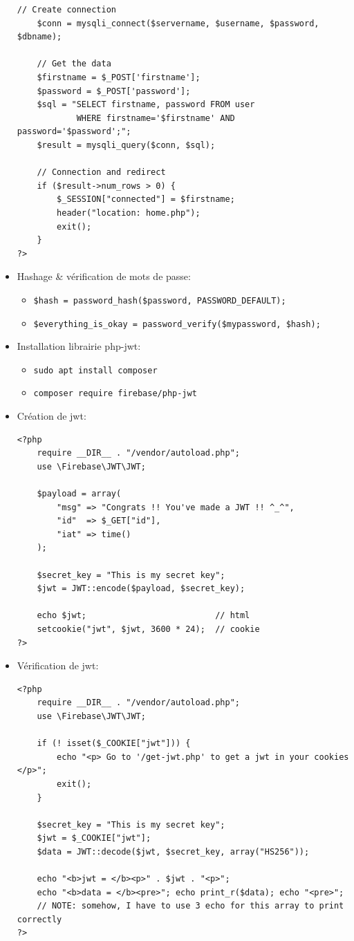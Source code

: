 \documentclass[a4paper]{article}
\begin{document}
\begin{itemize}
\begin{lstlisting}[style=php]
    // Create connection
    $conn = mysqli_connect($servername, $username, $password, $dbname);

    // Get the data
    $firstname = $_POST['firstname'];
    $password = $_POST['password'];
    $sql = "SELECT firstname, password FROM user
            WHERE firstname='$firstname' AND password='$password';";
    $result = mysqli_query($conn, $sql);

    // Connection and redirect
    if ($result->num_rows > 0) {
        $_SESSION["connected"] = $firstname;
        header("location: home.php");
        exit();
    }
?>
\end{lstlisting}


\item Hashage \& vérification de mots de passe:
\begin{itemize}
    \item \texttt{\$hash = password\_hash(\$password, PASSWORD\_DEFAULT);}
    \item \texttt{\$everything\_is\_okay = password\_verify(\$mypassword, \$hash);}
\end{itemize}


\item Installation librairie php-jwt:
\begin{itemize}
    \item \texttt{sudo apt install composer}
    \item \texttt{composer require firebase/php-jwt}
\end{itemize}


\item Création de jwt:
\begin{lstlisting}[style=php]
<?php
    require __DIR__ . "/vendor/autoload.php";
    use \Firebase\JWT\JWT;

    $payload = array(
        "msg" => "Congrats !! You've made a JWT !! ^_^",
        "id"  => $_GET["id"],
        "iat" => time()
    );

    $secret_key = "This is my secret key";
    $jwt = JWT::encode($payload, $secret_key);

    echo $jwt;                          // html
    setcookie("jwt", $jwt, 3600 * 24);  // cookie
?>
\end{lstlisting}


\item Vérification de jwt:
\begin{lstlisting}[style=php]
<?php
    require __DIR__ . "/vendor/autoload.php";
    use \Firebase\JWT\JWT;

    if (! isset($_COOKIE["jwt"])) {
        echo "<p> Go to '/get-jwt.php' to get a jwt in your cookies </p>";
        exit();
    }

    $secret_key = "This is my secret key";
    $jwt = $_COOKIE["jwt"];
    $data = JWT::decode($jwt, $secret_key, array("HS256"));

    echo "<b>jwt = </b><p>" . $jwt . "<p>";
    echo "<b>data = </b><pre>"; echo print_r($data); echo "<pre>";
    // NOTE: somehow, I have to use 3 echo for this array to print correctly
?>
\end{lstlisting}


\end{itemize}
\end{document}
